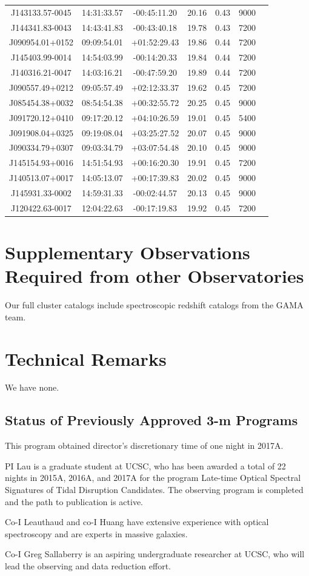 \documentclass[letterpaper,12pt]{article}
\begin{document}
\begin{table}
\begin{tabular}{ccccccc}
J143133.57-0045 & 14:31:33.57 & -00:45:11.20 & 20.16 & 0.43 & 9000 \\
J144341.83-0043 & 14:43:41.83 & -00:43:40.18 & 19.78 & 0.43 & 7200 \\
J090954.01+0152 & 09:09:54.01 & +01:52:29.43 & 19.86 & 0.44 & 7200 \\
J145403.99-0014 & 14:54:03.99 & -00:14:20.33 & 19.84 & 0.44 & 7200 \\
J140316.21-0047 & 14:03:16.21 & -00:47:59.20 & 19.89 & 0.44 & 7200 \\
J090557.49+0212 & 09:05:57.49 & +02:12:33.37 & 19.62 & 0.45 & 7200 \\
J085454.38+0032 & 08:54:54.38 & +00:32:55.72 & 20.25 & 0.45 & 9000 \\
J091720.12+0410 & 09:17:20.12 & +04:10:26.59 & 19.01 & 0.45 & 5400 \\
J091908.04+0325 & 09:19:08.04 & +03:25:27.52 & 20.07 & 0.45 & 9000 \\
J090334.79+0307 & 09:03:34.79 & +03:07:54.48 & 20.10 & 0.45 & 9000 \\
J145154.93+0016 & 14:51:54.93 & +00:16:20.30 & 19.91 & 0.45 & 7200 \\
J140513.07+0017 & 14:05:13.07 & +00:17:39.83 & 20.02 & 0.45 & 9000 \\
J145931.33-0002 & 14:59:31.33 & -00:02:44.57 & 20.13 & 0.45 & 9000 \\
J120422.63-0017 & 12:04:22.63 & -00:17:19.83 & 19.92 & 0.45 & 7200 \\
\hline
\end{tabular}
\end{table}

\section{Supplementary Observations Required from other Observatories}

Our full cluster catalogs include spectroscopic redshift catalogs from the GAMA team. 

\section{Technical Remarks}

We have none. 

\subsection{Status of Previously Approved 3-m Programs}

This program obtained director's discretionary time of one night in 2017A.

PI Lau is a graduate student at UCSC, who has been awarded a total of 22 nights in 2015A, 2016A, 
and 2017A for the program Late-time Optical Spectral Signatures of Tidal Disruption Candidates. 
The observing program is completed and the path to publication is active. 

Co-I Leauthaud and co-I Huang have extensive experience with optical spectroscopy and are experts 
in massive galaxies. 

Co-I Greg Sallaberry is an aspiring undergraduate researcher at UCSC, who will lead the observing 
and data reduction effort. 
\end{document}
